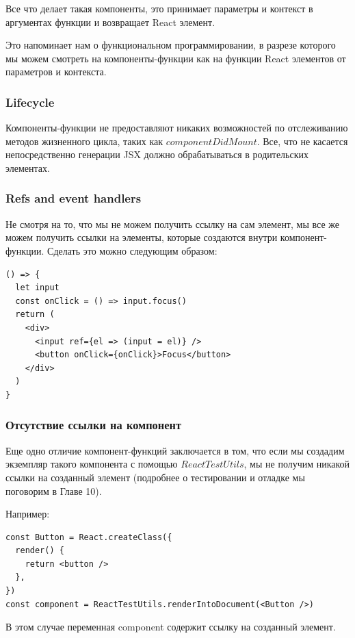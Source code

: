 Все что делает такая компоненты, это принимает параметры и контекст в аргументах функции и возвращает React элемент.

Это напоминает нам о функциональном программировании, в разрезе которого мы можем смотреть на компоненты-функции как на функции React элементов от параметров и контекста.

\subsubsection*{Lifecycle}

Компоненты-функции не предоставляют никаких возможностей по отслеживанию методов жизненного цикла, таких как $componentDidMount$. Все, что не касается непосредственно генерации JSX должно обрабатываться в родительских элементах.

\subsubsection*{Refs and event handlers}

Не смотря на то, что мы не можем получить ссылку на сам элемент, мы все же можем получить ссылки на элементы, которые создаются внутри компонент-функции. Сделать это можно следующим образом:

\begin{lstlisting}
() => {
  let input
  const onClick = () => input.focus()
  return (
    <div>
      <input ref={el => (input = el)} />
      <button onClick={onClick}>Focus</button>
    </div>
  ) 
}
\end{lstlisting}

\subsubsection*{Отсутствие ссылки на компонент}

Еще одно отличие компонент-функций заключается в том, что если мы создадим экземпляр такого компонента с помощью $ReactTestUtils$, мы не получим никакой ссылки на созданный элемент (подробнее о тестировании и отладке мы поговорим в Главе 10).

Например:

\begin{lstlisting}
const Button = React.createClass({
  render() {
    return <button />
  },
})
const component = ReactTestUtils.renderIntoDocument(<Button />)
\end{lstlisting}

В этом случае переменная component содержит ссылку на созданный элемент.

